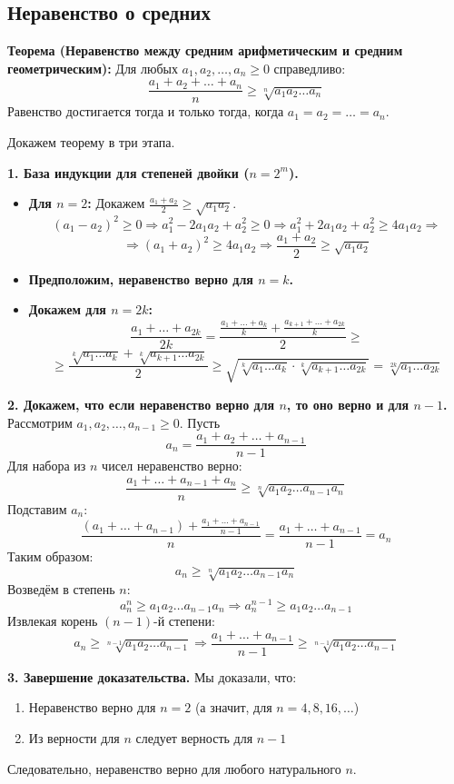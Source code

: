 \documentclass[12pt, a4paper]{article}
\begin{document}
\subsection{Неравенство о средних}
\begin{tcolorbox}
\textbf{Теорема (Неравенство между средним арифметическим и средним геометрическим):}
Для любых $a_1, a_2, \dots, a_n \geq 0$ справедливо:
$$\frac{a_1 + a_2 + \dots + a_n}{n} \geq \sqrt[n]{a_1 a_2 \dots a_n}$$
Равенство достигается тогда и только тогда, когда $a_1 = a_2 = \dots = a_n$.
\end{tcolorbox}

\begin{tcolorbox}[title=Доказательство по ММИ (метод Коши / метод обратой индукции), breakable]
Докажем теорему в три этапа.

\textbf{1. База индукции для степеней двойки ($n=2^m$).}
\begin{itemize}
    \item \textbf{Для $n=2$:} Докажем $\frac{a_1 + a_2}{2} \geq \sqrt{a_1 a_2}$.
    $$(a_1 - a_2)^2 \geq 0 \Rightarrow a_1^2 - 2a_1a_2 + a_2^2 \geq 0 \Rightarrow a_1^2 + 2a_1a_2 + a_2^2 \geq 4a_1a_2 \Rightarrow$$
    $$\Rightarrow (a_1 + a_2)^2 \geq 4a_1a_2 \Rightarrow \frac{a_1 + a_2}{2} \geq \sqrt{a_1 a_2}$$
    \item \textbf{Предположим, неравенство верно для $n = k$.}
    \item \textbf{Докажем для $n = 2k$:}
    $$\frac{a_1 + \dots + a_{2k}}{2k} = \frac{\frac{a_1 + \dots + a_k}{k} + \frac{a_{k+1} + \dots + a_{2k}}{k}}{2} \geq$$
    $$\geq \frac{\sqrt[k]{a_1 \dots a_k} + \sqrt[k]{a_{k+1} \dots a_{2k}}}{2} \geq \sqrt{\sqrt[k]{a_1 \dots a_k} \cdot \sqrt[k]{a_{k+1} \dots a_{2k}}} = \sqrt[2k]{a_1 \dots a_{2k}}$$
\end{itemize}

\textbf{2. Докажем, что если неравенство верно для $n$, то оно верно и для $n-1$.}
Рассмотрим $a_1, a_2, \dots, a_{n-1} \geq 0$. Пусть
$$a_n = \frac{a_1 + a_2 + \dots + a_{n-1}}{n-1}$$
Для набора из $n$ чисел неравенство верно:
$$\frac{a_1 + \dots + a_{n-1} + a_n}{n} \geq \sqrt[n]{a_1 a_2 \dots a_{n-1} a_n}$$
Подставим $a_n$:
$$\frac{(a_1 + \dots + a_{n-1}) + \frac{a_1 + \dots + a_{n-1}}{n-1}}{n} = \frac{a_1 + \dots + a_{n-1}}{n-1} = a_n$$
Таким образом:
$$a_n \geq \sqrt[n]{a_1 a_2 \dots a_{n-1} a_n}$$
Возведём в степень $n$:
$$a_n^n \geq a_1 a_2 \dots a_{n-1} a_n \Rightarrow a_n^{n-1} \geq a_1 a_2 \dots a_{n-1}$$
Извлекая корень $(n-1)$-й степени:
$$a_n \geq \sqrt[n-1]{a_1 a_2 \dots a_{n-1}} \Rightarrow \frac{a_1 + \dots + a_{n-1}}{n-1} \geq \sqrt[n-1]{a_1 a_2 \dots a_{n-1}}$$

\textbf{3. Завершение доказательства.}
Мы доказали, что:
\begin{enumerate}
    \item Неравенство верно для $n=2$ (а значит, для $n=4,8,16,\dots$)
    \item Из верности для $n$ следует верность для $n-1$
\end{enumerate}
Следовательно, неравенство верно для любого натурального $n$.
\end{tcolorbox}
\end{document}
